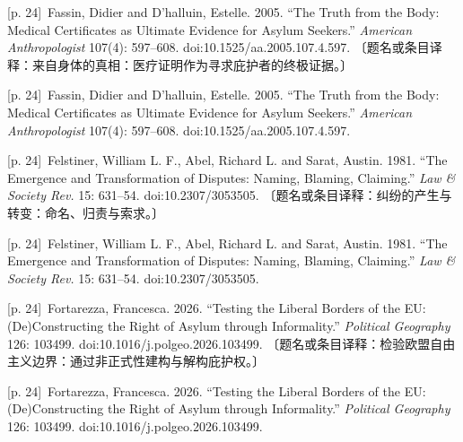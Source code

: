 \documentclass[10pt,a4paper]{article}
\begin{document}
\noindent\begin{minipage}{\textwidth}\begin{minipage}[t]{\dimexpr.5\textwidth-4mm\relax}{\scriptsize\color{gray} [p. 24]}\ Fassin, Didier and D’halluin, Estelle. 2005. “The Truth from the Body: Medical Certificates as Ultimate Evidence for Asylum Seekers.” \textit{American Anthropologist} 107(4): 597–608. doi:10.1525/aa.2005.107.4.597. 〔题名或条目译释：来自身体的真相：医疗证明作为寻求庇护者的终极证据。〕\par\end{minipage}\hfill\begin{minipage}[t]{\dimexpr.5\textwidth-4mm\relax}{\scriptsize\color{gray} [p. 24]}\ Fassin, Didier and D’halluin, Estelle. 2005. “The Truth from the Body: Medical Certificates as Ultimate Evidence for Asylum Seekers.” \textit{American Anthropologist} 107(4): 597–608. doi:10.1525/aa.2005.107.4.597.\par\end{minipage}\end{minipage}\par
\noindent\begin{minipage}{\textwidth}\begin{minipage}[t]{\dimexpr.5\textwidth-4mm\relax}{\scriptsize\color{gray} [p. 24]}\ Felstiner, William L. F., Abel, Richard L. and Sarat, Austin. 1981. “The Emergence and Transformation of Disputes: Naming, Blaming, Claiming.” \textit{Law \& Society Rev.} 15: 631–54. doi:10.2307/3053505. 〔题名或条目译释：纠纷的产生与转变：命名、归责与索求。〕\par\end{minipage}\hfill\begin{minipage}[t]{\dimexpr.5\textwidth-4mm\relax}{\scriptsize\color{gray} [p. 24]}\ Felstiner, William L. F., Abel, Richard L. and Sarat, Austin. 1981. “The Emergence and Transformation of Disputes: Naming, Blaming, Claiming.” \textit{Law \& Society Rev.} 15: 631–54. doi:10.2307/3053505.\par\end{minipage}\end{minipage}\par
\noindent\begin{minipage}{\textwidth}\begin{minipage}[t]{\dimexpr.5\textwidth-4mm\relax}{\scriptsize\color{gray} [p. 24]}\ Fortarezza, Francesca. 2026. “Testing the Liberal Borders of the EU: (De)Constructing the Right of Asylum through Informality.” \textit{Political Geography} 126: 103499. doi:10.1016/j.polgeo.2026.103499. 〔题名或条目译释：检验欧盟自由主义边界：通过非正式性建构与解构庇护权。〕\par\end{minipage}\hfill\begin{minipage}[t]{\dimexpr.5\textwidth-4mm\relax}{\scriptsize\color{gray} [p. 24]}\ Fortarezza, Francesca. 2026. “Testing the Liberal Borders of the EU: (De)Constructing the Right of Asylum through Informality.” \textit{Political Geography} 126: 103499. doi:10.1016/j.polgeo.2026.103499.\par\end{minipage}\end{minipage}\par
\end{document}
